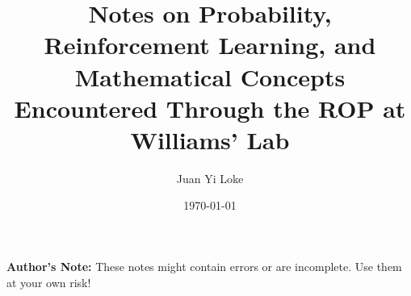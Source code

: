 \documentclass[]{article}
\begin{document}
%



%

\title{Notes on Probability, Reinforcement Learning, and Mathematical Concepts Encountered Through the ROP at Williams' Lab}
\author{Juan Yi Loke}
\date{\today}

\maketitle


\noindent \textbf{Author's Note:} These notes might contain errors or are incomplete. Use them at your own risk!


%











%

\end{document}
